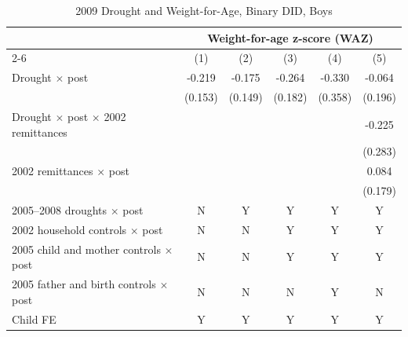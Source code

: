 \documentclass[12pt]{article}
\begin{document}
\begin{longtable}{l*{5}{c}}
\caption{2009 Drought and Weight-for-Age, Binary DID, Boys}\\
\toprule
 & \multicolumn{5}{c}{Weight-for-age z-score (WAZ)}\\
\cmidrule(lr){2-6}
            &\multicolumn{1}{c}{(1)}         &\multicolumn{1}{c}{(2)}         &\multicolumn{1}{c}{(3)}         &\multicolumn{1}{c}{(4)}         &\multicolumn{1}{c}{(5)}         \\
\midrule
Drought \ensuremath{\times} post&      -0.219         &      -0.175         &      -0.264         &      -0.330         &      -0.064         \\
            &     (0.153)         &     (0.149)         &     (0.182)         &     (0.358)         &     (0.196)         \\
Drought \ensuremath{\times} post \ensuremath{\times} 2002 remittances&                     &                     &                     &                     &      -0.225         \\
            &                     &                     &                     &                     &     (0.283)         \\
2002 remittances \ensuremath{\times} post&                     &                     &                     &                     &       0.084         \\
            &                     &                     &                     &                     &     (0.179)         \\
\midrule
2005--2008 droughts \ensuremath{\times} post&           N         &           Y         &           Y         &           Y         &           Y         \\
2002 household controls \ensuremath{\times} post&           N         &           N         &           Y         &           Y         &           Y         \\
2005 child and mother controls \ensuremath{\times} post&           N         &           N         &           Y         &           Y         &           Y         \\
2005 father and birth controls \ensuremath{\times} post&           N         &           N         &           N         &           Y         &           N         \\
Child FE    &           Y         &           Y         &           Y         &           Y         &           Y         \\

\end{longtable}
\end{document}
